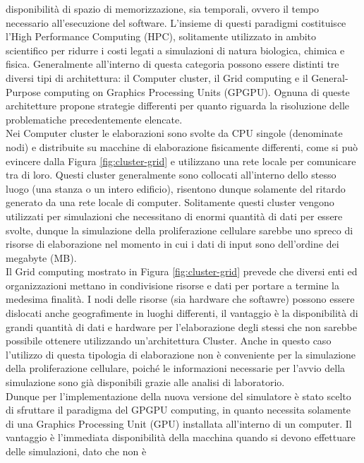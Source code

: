 disponibilità di spazio di memorizzazione, sia temporali, ovvero il tempo 
necessario all'esecuzione del software. L'insieme di questi paradigmi 
costituisce l'High Performance Computing (HPC), solitamente utilizzato in 
ambito scientifico per ridurre i costi legati a simulazioni di natura 
biologica, chimica e fisica.
Generalmente all'interno di questa categoria possono essere distinti tre 
diversi tipi di architettura: il Computer cluster, il Grid computing e 
il General-Purpose computing on Graphics Processing Units (GPGPU).
Ognuna di queste architetture propone strategie differenti per quanto riguarda 
la risoluzione delle problematiche precedentemente elencate.
\\
Nei Computer cluster le elaborazioni sono svolte da CPU singole
(denominate nodi) e distribuite su macchine di elaborazione fisicamente 
differenti, come si può evincere dalla Figura \ref{fig:cluster-grid} 
e utilizzano una rete locale per comunicare tra di loro. Questi cluster
generalmente sono collocati all'interno dello stesso luogo
(una stanza o un intero edificio), risentono dunque solamente del ritardo generato
da una rete locale di computer. Solitamente questi cluster vengono utilizzati 
per simulazioni che necessitano di enormi quantità di dati per essere svolte, 
dunque la simulazione della proliferazione 
cellulare sarebbe uno spreco di risorse di elaborazione nel momento in cui i 
dati di input sono dell'ordine dei megabyte (MB).
\\
Il Grid computing mostrato in Figura \ref{fig:cluster-grid}
prevede che diversi enti ed organizzazioni mettano in condivisione risorse e
dati per portare a termine la medesima finalità.
I nodi delle risorse (sia hardware che softawre) possono essere
dislocati anche geografimente in luoghi differenti, 
il vantaggio è la disponibilità di grandi
quantità di dati e hardware per l'elaborazione degli stessi che non sarebbe
possibile ottenere utilizzando un'architettura Cluster. Anche in questo caso 
l'utilizzo di questa tipologia di elaborazione non è conveniente per la 
simulazione della proliferazione cellulare, poiché le informazioni necessarie 
per l'avvio della simulazione sono già disponibili grazie alle analisi di 
laboratorio.
\\
Dunque per l'implementazione della nuova versione del simulatore è stato scelto 
di sfruttare il paradigma del GPGPU computing, in quanto 
necessita solamente di una Graphics Processing Unit (GPU) installata 
all'interno di un computer. Il vantaggio è l'immediata disponibilità della 
macchina quando si devono effettuare delle simulazioni, dato che non è 
